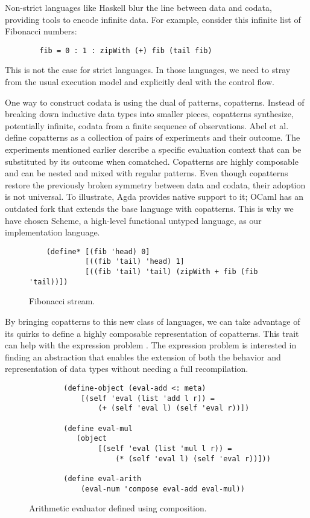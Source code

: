 Non-strict languages like Haskell blur the line between data and codata, providing tools to encode infinite data.
For example, consider this infinite list of Fibonacci numbers:
    \begin{verbatim}
        fib = 0 : 1 : zipWith (+) fib (tail fib)
    \end{verbatim}
This is not the case for strict languages. In those languages, we need to stray from the usual execution model and explicitly deal with the control flow.

One way to construct codata is using the dual of patterns, copatterns.
Instead of breaking down inductive data types into smaller pieces, copatterns synthesize, potentially infinite, codata from a finite sequence of observations.
Abel et al. \cite{APTS2013C} define copatterns as a collection of pairs of experiments and their outcome.
The experiments mentioned earlier describe a specific evaluation context that can be substituted by its outcome when comatched.
Copatterns are highly composable and can be nested and mixed with regular patterns.
Even though copatterns restore the previously broken symmetry between data and codata, their adoption is not universal.
To illustrate, Agda provides native support to it; OCaml has an outdated fork that extends the base language with copatterns.
This is why we have chosen Scheme, a high-level functional untyped language, as our implementation language.

\begin{figure}
    \begin{verbatim}
    (define* [(fib 'head) 0]
             [((fib 'tail) 'head) 1]
             [((fib 'tail) 'tail) (zipWith + fib (fib 'tail))])
    \end{verbatim}
    \caption{Fibonacci stream.}
    \label{fig:ex-fib}
\end{figure}

By bringing copatterns to this new class of languages, we can take advantage of its quirks to define a highly composable representation of copatterns.
This trait can help with the expression problem \cite{ExpressionProblem}.
The expression problem is interested in finding an abstraction that enables the extension of both the behavior and representation of data types without needing a full recompilation.
\begin{figure}
    \begin{verbatim}
        (define-object (eval-add <: meta)
            [(self 'eval (list 'add l r)) =
                (+ (self 'eval l) (self 'eval r))])

        (define eval-mul
           (object
                [(self 'eval (list 'mul l r)) =
                    (* (self 'eval l) (self 'eval r))]))
      
        (define eval-arith
            (eval-num 'compose eval-add eval-mul))
    \end{verbatim}
    \caption{Arithmetic evaluator defined using composition.}
    \label{fig:ex-arith-eval}
\end{figure}


